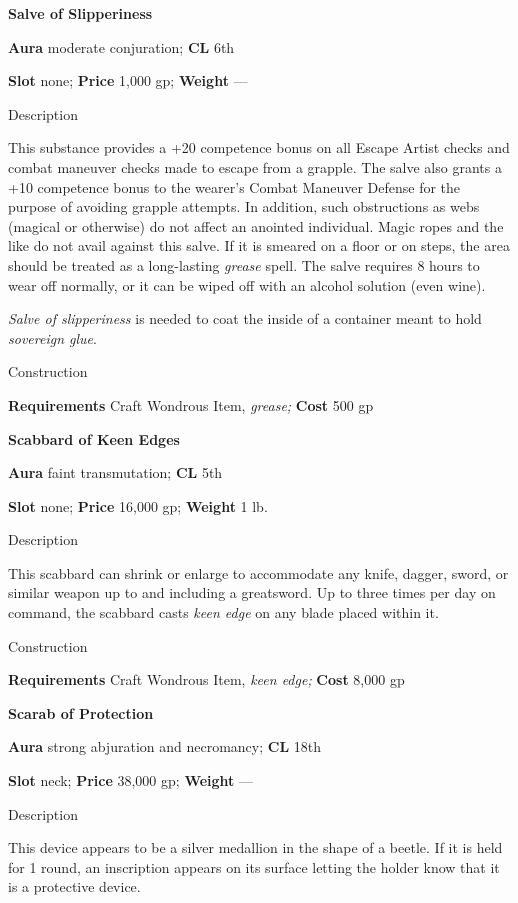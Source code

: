 \textbf{Salve of Slipperiness}
				
\textbf{Aura} moderate conjuration;\textbf{ CL }6th
				
\textbf{Slot} none; \textbf{Price} 1,000 gp; \textbf{Weight }---
				
Description
				
This substance provides a +20 competence bonus on all Escape Artist checks and combat maneuver checks made to escape from a grapple. The salve also grants a +10 competence bonus to the wearer's Combat Maneuver Defense for the purpose of avoiding grapple attempts. In addition, such obstructions as webs (magical or otherwise) do not affect an anointed individual. Magic ropes and the like do not avail against this salve. If it is smeared on a floor or on steps, the area should be treated as a long-lasting \textit{grease} spell. The salve requires 8 hours to wear off normally, or it can be wiped off with an alcohol solution (even wine).
				
\textit{Salve of slipperiness} is needed to coat the inside of a container meant to hold \textit{sovereign glue}. 
				
Construction
				
\textbf{Requirements} Craft Wondrous Item,\textit{ grease;}\textbf{ Cost }500 gp
				
\textbf{Scabbard of Keen Edges}
				
\textbf{Aura} faint transmutation;\textbf{ CL }5th
				
\textbf{Slot} none; \textbf{Price} 16,000 gp; \textbf{Weight} 1 lb.
				
Description
				
This scabbard can shrink or enlarge to accommodate any knife, dagger, sword, or similar weapon up to and including a greatsword. Up to three times per day on command, the scabbard casts \textit{keen edge }on any blade placed within it. 
				
Construction
				
\textbf{Requirements} Craft Wondrous Item,\textit{ keen edge;}\textbf{ Cost }8,000 gp
				
\textbf{Scarab of Protection}
				
\textbf{Aura} strong abjuration and necromancy;\textbf{ CL }18th
				
\textbf{Slot} neck; \textbf{Price} 38,000 gp; \textbf{Weight }---
				
Description
				
This device appears to be a silver medallion in the shape of a beetle. If it is held for 1 round, an inscription appears on its surface letting the holder know that it is a protective device.
				
